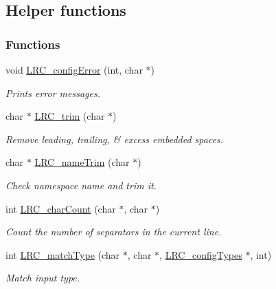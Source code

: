 \hypertarget{group___l_r_c__internals}{
\subsection{Helper functions}
\label{group___l_r_c__internals}
}
\subsubsection*{Functions}
\begin{DoxyCompactItemize}
\item 
void \hyperlink{group___l_r_c__internals_ga0768167abe6a143840f26439a86ec79d}{LRC\_\-configError} (int, char $\ast$)
\begin{DoxyCompactList}\small\item\em Prints error messages. \item\end{DoxyCompactList}\item 
char $\ast$ \hyperlink{group___l_r_c__internals_ga01c101649d6e132e1098711f84023ce7}{LRC\_\-trim} (char $\ast$)
\begin{DoxyCompactList}\small\item\em Remove leading, trailing, \& excess embedded spaces. \item\end{DoxyCompactList}\item 
char $\ast$ \hyperlink{group___l_r_c__internals_ga713edeb31c0d15e409403be5a5f28ad8}{LRC\_\-nameTrim} (char $\ast$)
\begin{DoxyCompactList}\small\item\em Check namespace name and trim it. \item\end{DoxyCompactList}\item 
int \hyperlink{group___l_r_c__internals_gaadc8707a894b997457d320923c940721}{LRC\_\-charCount} (char $\ast$, char $\ast$)
\begin{DoxyCompactList}\small\item\em Count the number of separators in the current line. \item\end{DoxyCompactList}\item 
int \hyperlink{group___l_r_c__internals_ga4b2785b5ee9a3ab984c9dcfd3f9b3283}{LRC\_\-matchType} (char $\ast$, char $\ast$, \hyperlink{struct_l_r_c__config_types}{LRC\_\-configTypes} $\ast$, int)
\begin{DoxyCompactList}\small\item\em Match input type. \item\end{DoxyCompactList}\item 

\end{DoxyCompactItemize}
